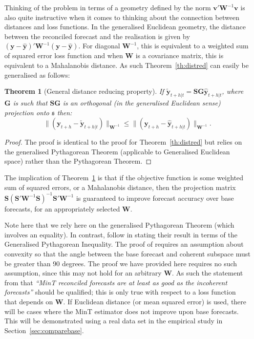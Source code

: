 \documentclass[12pt]{article}
\newtheorem{theo}{Theorem}[section]
\theoremstyle{definition}
\begin{document}
Thinking of the problem in terms of a geometry defined by the norm $\bm{v}'\bm{W}^{-1}\bm{v}$ is also quite instructive when it comes to thinking about the connection between distances and loss functions. In the generalised Euclidean geometry, the distance between the reconciled forecast and the realisation is given by $(\bm{y}-\hat{\bm{y}})'\bm{W}^{-1}(\bm{y}-\hat{\bm{y}})$.  For diagonal $\bm{W}^{-1}$, this is equivalent to a weighted sum of squared error loss function and when $\bm{W}$ is a covariance matrix, this is equivalent to a Mahalanobis distance.  As such Theorem~\ref{th:distred} can easily be generalised as follows:
	
	\begin{theo}[General distance reducing property]\label{th:gdistred}
        If $\tilde{\bm{y}}_{t+h|t}=\bm{S}\bm{G}\hat{\bm{y}}_{t+h|t}$, where $\bm{G}$ is such that $\bm{S}\bm{G}$ is an orthogonal (in the generalised Euclidean sense) projection onto $\mathfrak{s}$ then:
		\begin{equation*}
		\|(\bm{y}_{t+h}-\tilde{\bm{y}}_{t+h|t})\|_{{\bm W}^{-1}}\le\|(\bm{y}_{t+h}-\hat{\bm{y}}_{t+h|t})\|_{{\bm W}^{-1}}.
		\end{equation*}
	\end{theo}
	\begin{proof}
    The proof is identical to the proof for Theorem~\ref{th:distred} but relies on the generalised Pythagorean Theorem (applicable to Generalised Euclidean space) rather than the Pythagorean Theorem.
    \end{proof}
	
	The implication of Theorem~\ref{th:gdistred} is that if the objective function is some weighted sum of squared errors, or a Mahalanobis distance, then the projection matrix $\bm{S}\left(\bm{S}'\bm{W}^{-1}\bm{S}\right)^{-1}\bm{S}'\bm{W}^{-1}$ is guaranteed to improve forecast accuracy over base forecasts, for an appropriately selected $\bm{W}$.
	
	Note here that we rely here on the generalised Pythagorean Theorem (which involves an equality).  In contrast, \cite{WicEtAl2019} follow \cite{VanErven2015a} in stating their result in terms of the Generalised Pythagorean Inequality.  The proof of \cite{WicEtAl2019} requires an assumption about convexity so that the angle between the base forecast and coherent subspace must be greater than 90 degrees.  The proof we have provided here requires no such assumption, since this may not hold for an arbitrary $\bm{W}$.  As such the statement from \cite{WicEtAl2019} that {\em``MinT reconciled forecasts are at least as good as the incoherent forecasts''} should be qualified; this is only true with respect to a loss function that depends on ${\bm W}$.  If Euclidean distance (or mean squared error) is used, there will be cases where the MinT estimator does not improve upon base forecasts.  This will be demonstrated using a real data set in the empirical study in Section~\ref{sec:comparebase}.
	
\end{document}
